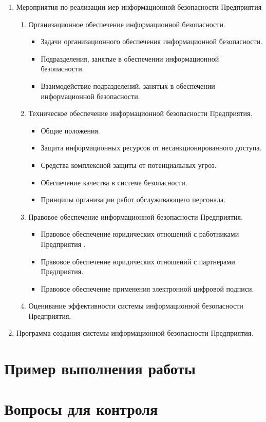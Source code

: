 \begin{enumerate}
	\item Мероприятия по реализации мер информационной безопасности Предприятия
	\begin{enumerate}
		\item Организационное обеспечение информационной безопасности.
		\begin{itemize}
			\item Задачи организационного обеспечения информационной безопасности.
			\item Подразделения, занятые в обеспечении информационной безопасности.
			\item Взаимодействие подразделений, занятых в обеспечении информационной безопасности.
		\end{itemize}
		
		\item Техническое обеспечение информационной безопасности Предприятия.
		\begin{itemize}
			\item Общие положения.
			\item Защита информационных ресурсов от несанкционированного доступа.
			\item Средства комплексной защиты от потенциальных угроз.
			\item Обеспечение качества в системе безопасности.
			\item Принципы организации работ обслуживающего персонала.
		\end{itemize}
		
		\item Правовое обеспечение информационной безопасности Предприятия.
		\begin{itemize}
			\item Правовое обеспечение юридических отношений с работниками Предприятия .
			\item Правовое обеспечение юридических отношений с партнерами Предприятия.
			\item Правовое обеспечение применения электронной цифровой подписи.
		\end{itemize}
		\item Оценивание эффективности системы информационной безопасности Предприятия.
	\end{enumerate}
	
	\item Программа создания системы информационной безопасности Предприятия.
\end{enumerate}

\section{Пример выполнения работы}\label{sect3_c}
%

\section{Вопросы для контроля}\label{sect3_e}
%
